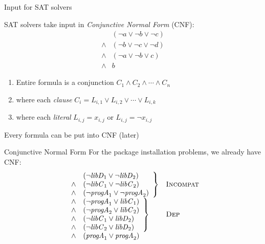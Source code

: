 \documentclass[xetex,aspectratio=169,14pt,hyperref={pdfpagelabels=true,pdflang={en-GB}}]{beamer}
\begin{document}
\begin{frame}
  {Input for SAT solvers}

  SAT solvers take input in \emph{Conjunctive Normal Form} (CNF):
  \begin{displaymath}
    \begin{array}{cl}
      &(\lnot a \lor \lnot b \lor \lnot c) \\
      \land&(\lnot b \lor \lnot c \lor \lnot d) \\
      \land&(\lnot a \lor \lnot b \lor c) \\
      \land&b
    \end{array}
  \end{displaymath}
  \begin{enumerate}
  \item Entire formula is a conjunction $C_1 \land C_2 \land \cdots \land C_n$
  \item where each \emph{clause} $C_i = L_{i,1} \lor L_{i,2} \lor \cdots \lor L_{i,k}$
  \item where each \emph{literal} $L_{i,j} = x_{i,j}$ or $L_{i,j} = \lnot x_{i,j}$
  \end{enumerate}

  \raggedleft
  {\footnotesize \textcolor{black!60}{Every formula can be put into CNF (later)}}

  \raggedright

\end{frame}

\begin{frame}
  {Conjunctive Normal Form}
  For the package installation problems, we already have CNF:
  \begin{displaymath}
    \begin{array}{ll}
      \left.
      \begin{array}{cl}
        &(\lnot \mathit{libD}_1 \lor \lnot \mathit{libD}_2) \\
        \land&(\lnot \mathit{libC}_1 \lor \lnot \mathit{libC}_2) \\
        \land&(\lnot \mathit{progA}_1 \lor \lnot \mathit{progA}_2)
      \end{array}
      \right\}
      &
        \textsc{Incompat}
      \\
      \left.
      \begin{array}{cl}
        \land&(\lnot \mathit{progA}_1 \lor \mathit{libC}_1) \\
        \land&(\lnot \mathit{progA}_2 \lor \mathit{libC}_2) \\
        \land&(\lnot \mathit{libC}_1 \lor \mathit{libD}_2) \\
        \land&(\lnot \mathit{libC}_2 \lor \mathit{libD}_2)
      \end{array}
               \right\} & \textsc{Dep}
      \\
      \left.\begin{array}{cl}
        \land &(\mathit{progA}_1 \lor \mathit{progA}_2)
      \end{array}\right.
    \end{array}
  \end{displaymath}

\end{frame}
\end{document}
